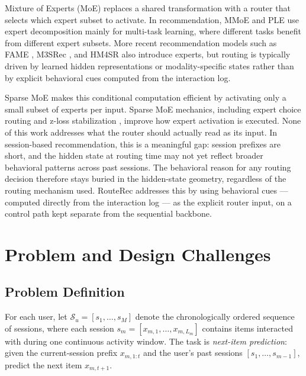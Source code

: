 \documentclass[sigconf,review,anonymous]{acmart}
\begin{document}
Mixture of Experts (MoE) \cite{jacobs1991adaptive,jordan1994hme} replaces a shared transformation with a router that selects which expert subset to activate. In recommendation, MMoE \cite{ma2018mmoe} and PLE \cite{tang2020ple} use expert decomposition mainly for multi-task learning, where different tasks benefit from different expert subsets. More recent recommendation models such as FAME \cite{liu2025fame}, M3SRec \cite{bian2023m3srec}, and HM4SR \cite{zhang2025hm4sr} also introduce experts, but routing is typically driven by learned hidden representations or modality-specific states rather than by explicit behavioral cues computed from the interaction log.

Sparse MoE \cite{shazeer2017moe,fedus2022switch} makes this conditional computation efficient by activating only a small subset of experts per input.
Sparse MoE mechanics, including expert choice routing \cite{zhou2022expertchoice} and z-loss stabilization \cite{zoph2022stmoe}, improve how expert activation is executed. None of this work addresses what the router should actually read as its input. In session-based recommendation, this is a meaningful gap: session prefixes are short, and the hidden state at routing time may not yet reflect broader behavioral patterns across past sessions. The behavioral reason for any routing decision therefore stays buried in the hidden-state geometry, regardless of the routing mechanism used. RouteRec addresses this by using behavioral cues --- computed directly from the interaction log --- as the explicit router input, on a control path kept separate from the sequential backbone.

\section{Problem and Design Challenges}
\label{sec:problem}

\subsection{Problem Definition}

For each user, let $\mathcal{S}_u=[s_1,\dots,s_M]$ denote the chronologically ordered sequence of sessions, where each session $s_m=[x_{m,1},\dots,x_{m,L_m}]$ contains items interacted with during one continuous activity window. The task is \emph{next-item prediction}: given the current-session prefix $x_{m,1:t}$ and the user's past sessions $[s_1,\dots,s_{m-1}]$, predict the next item $x_{m,t+1}$.
\end{document}
